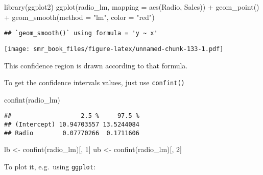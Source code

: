 \documentclass[
  oneside]{book}
\newenvironment{Shaded}{\begin{snugshade}}{\end{snugshade}}
\newcommand{\AttributeTok}[1]{\textcolor[rgb]{0.77,0.63,0.00}{#1}}
\newcommand{\DecValTok}[1]{\textcolor[rgb]{0.00,0.00,0.81}{#1}}
\newcommand{\FunctionTok}[1]{\textcolor[rgb]{0.00,0.00,0.00}{#1}}
\newcommand{\NormalTok}[1]{#1}
\newcommand{\OtherTok}[1]{\textcolor[rgb]{0.56,0.35,0.01}{#1}}
\newcommand{\SpecialCharTok}[1]{\textcolor[rgb]{0.00,0.00,0.00}{#1}}
\newcommand{\StringTok}[1]{\textcolor[rgb]{0.31,0.60,0.02}{#1}}
\begin{document}
\begin{Shaded}
\begin{Highlighting}[]
\FunctionTok{library}\NormalTok{(ggplot2)}
\FunctionTok{ggplot}\NormalTok{(radio\_lm, }\AttributeTok{mapping =} \FunctionTok{aes}\NormalTok{(Radio, Sales)) }\SpecialCharTok{+}
  \FunctionTok{geom\_point}\NormalTok{() }\SpecialCharTok{+}
  \FunctionTok{geom\_smooth}\NormalTok{(}\AttributeTok{method =} \StringTok{"lm"}\NormalTok{, }\AttributeTok{color =} \StringTok{"red"}\NormalTok{)}
\end{Highlighting}
\end{Shaded}

\begin{verbatim}
## `geom_smooth()` using formula = 'y ~ x'
\end{verbatim}

\texttt{[image: smr\_book\_files/figure-latex/unnamed-chunk-133-1.pdf]}

This confidence region is drawn according to that formula.

To get the confidence intervals values, just use \texttt{confint()}

\begin{Shaded}
\begin{Highlighting}[]
\FunctionTok{confint}\NormalTok{(radio\_lm)}
\end{Highlighting}
\end{Shaded}

\begin{verbatim}
##                   2.5 %     97.5 %
## (Intercept) 10.94703557 13.5244084
## Radio        0.07770266  0.1711606
\end{verbatim}

\begin{Shaded}
\begin{Highlighting}[]
\NormalTok{lb }\OtherTok{\textless{}{-}} \FunctionTok{confint}\NormalTok{(radio\_lm)[, }\DecValTok{1}\NormalTok{]}
\NormalTok{ub }\OtherTok{\textless{}{-}} \FunctionTok{confint}\NormalTok{(radio\_lm)[, }\DecValTok{2}\NormalTok{]}
\end{Highlighting}
\end{Shaded}

To plot it, e.g.~using \texttt{ggplot}:
\end{document}

